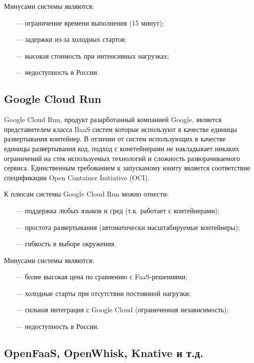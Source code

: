 Минусами системы являются:
\begin{itemize}
    \item[---]ограничение времени выполнения (15 минут);
    \item[---]задержки из-за холодных стартов;
    \item[---]высокая стоимость при интенсивных нагрузках;
    \item[---]недоступность в России.
\end{itemize}

\subsection{Google Cloud Run}

Google Cloud Run, продукт разарботанный компанией Google, является представителем класса BaaS систем которые используют в качестве единицы развертывания контейнер.
В отличии от систем использующих в качестве единицы развертывания код, подход с конетейнерами не накладывает никаких ограничений на стек используемых технологий и сложность разворачиваемого сервиса. Единственным требованием к запускамому юниту является соответствие спецификации Open Container Initiative (OCI)\cite{initiativeopen}.

К плюсам системы Google Cloud Run можно отнести:
\begin{itemize}
    \item[---]поддержка любых языков и сред (т.к. работает с контейнерами);
    \item[---]простота развертывания (автоматически масштабируемые контейнеры);
    \item[---]гибкость в выборе окружения.
\end{itemize}

Минусами системы являются:
\begin{itemize}
    \item[---]более высокая цена по сравнению с FaaS-решениями;
    \item[---]холодные старты при отсутствии постоянной нагрузки;
    \item[---]сильная интеграция с Google Cloud (ограниченная независимость);
    \item[---]недоступность в России.
\end{itemize}

\subsection{OpenFaaS, OpenWhisk, Knative и т.д.}

